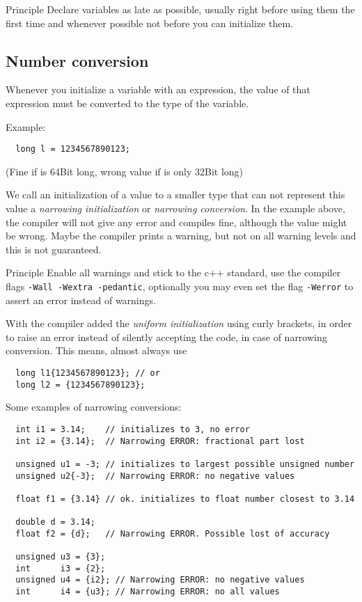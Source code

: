 \begin{guideline}{Principle}
  Declare variables as late as possible, usually right before using them the first time and whenever possible not before you can initialize them.
\end{guideline}



\subsection{Number conversion}
Whenever you initialize a variable with an expression, the value of that expression must be converted to the type of the variable.

Example:
\begin{verbatim}
  long l = 1234567890123;
\end{verbatim}
(Fine if  is 64Bit long, wrong value if  is only 32Bit long)

We call an initialization of a value to a smaller type that can not represent this value a \emph{narrowing initialization} or
\emph{narrowing conversion}. In the example above, the compiler will not give any error and compiles fine, although the value might be wrong.
Maybe the compiler prints a warning, but not on all warning levels and this is not guaranteed.

\begin{guideline}{Principle}
  Enable all warnings and stick to the c++ standard, \ie use the compiler flags \texttt{-Wall -Wextra -pedantic}, optionally you may
  even set the flag \texttt{-Werror} to assert an error instead of warnings.
\end{guideline}

With\marginpar{[\cxx{11}]}  the compiler added the \emph{uniform initialization} using curly brackets, in order to raise an error
instead of silently accepting the code, in case of narrowing conversion. This means, almost always use
\begin{verbatim}
  long l1{1234567890123}; // or
  long l2 = {1234567890123};
\end{verbatim}

Some examples of narrowing conversions:
\begin{verbatim}
  int i1 = 3.14;    // initializes to 3, no error
  int i2 = {3.14};  // Narrowing ERROR: fractional part lost

  unsigned u1 = -3; // initializes to largest possible unsigned number
  unsigned u2{-3};  // Narrowing ERROR: no negative values

  float f1 = {3.14} // ok. initializes to float number closest to 3.14

  double d = 3.14;
  float f2 = {d};   // Narrowing ERROR. Possible lost of accuracy

  unsigned u3 = {3};
  int      i3 = {2};
  unsigned u4 = {i2}; // Narrowing ERROR: no negative values
  int      i4 = {u3}; // Narrowing ERROR: no all values
\end{verbatim}

